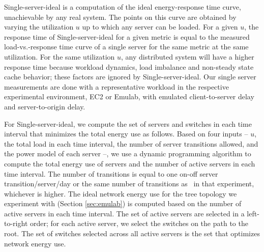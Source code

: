Single-server-ideal is a computation of the ideal energy-response time curve, unachievable by any real system. The points on this curve are obtained by varying the utilization $u$ up to which any server can be loaded. For a given $u$, the response time of Single-server-ideal for a given metric is equal to the measured load-vs.-response time curve of a single server for the same metric at the same utilization. For the same utilization $u$, any distributed system will have a higher response time because workload dynamics, load imbalance and non-steady state cache behavior; these factors are ignored by Single-server-ideal. Our single server measurements are done with a representative workload in the respective experimental environment, EC2 or Emulab, with emulated client-to-server delay and server-to-origin delay. 


For Single-server-ideal, we compute the set of servers and switches in each time interval that minimizes the total energy use as follows. Based on four inputs -- $u$, the total load in each time interval, the number of server transitions allowed, and the power model of each server --, we use a dynamic programming algorithm to compute the total energy use of servers and the number of active servers in each time interval. The number of transitions is equal to one on-off server transition/server/day or the same number of transitions as \shrink\ in that experiment, whichever is higher. The ideal network energy use for the tree topology we experiment with (Section \ref{sec:emulab}) is computed based on the number of active servers in each time interval. The set of active servers are selected in a left-to-right order; for each active server, we select the switches on the path to the root. The set of switches selected across all active servers is the set that optimizes network energy use.

